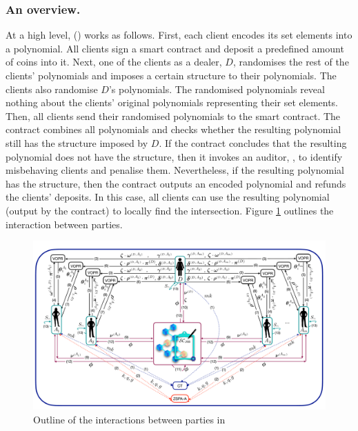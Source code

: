 \subsubsection{An overview.} At a high level, \withFai (\fpsi) works as follows. First, each client encodes its set elements into a polynomial. All clients sign a smart contract and deposit a predefined amount of coins into it.  Next,  one of the clients as a dealer, $D$, randomises the rest of the clients' polynomials and imposes a certain structure to their polynomials. The clients also randomise $D$'s polynomials. The randomised polynomials reveal nothing about the clients' original polynomials representing their set elements. Then, all clients send their randomised polynomials to the smart contract.  The contract combines all polynomials and checks whether the resulting polynomial still has the structure imposed by $D$. If the contract concludes that the resulting polynomial does not have the structure, then it invokes an auditor, \aud, to identify misbehaving clients and penalise them. Nevertheless, if the resulting polynomial has the structure, then the contract outputs an encoded polynomial and refunds the clients' deposits. In this case, all clients can use the resulting polynomial (output by the contract) to locally find the intersection. Figure \ref{fig:parties-interactions-in-Jus} outlines the interaction between parties. 


\begin{figure}[htp]
    \centering
    \includegraphics[width=14cm]{Diag-1.pdf}
    \caption{Outline of the interactions between parties in \withFai}\label{fig:parties-interactions-in-Jus}
\end{figure}




